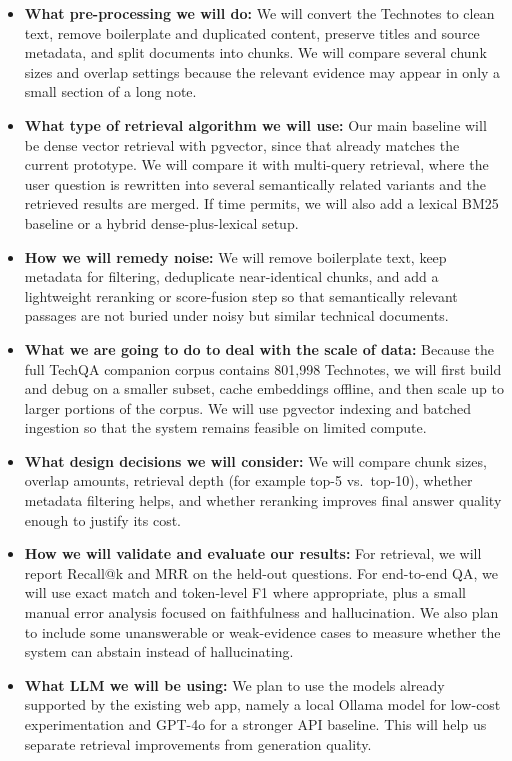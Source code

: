 \documentclass[paper=a4, fontsize=11pt]{scrartcl}
\begin{document}
\begin{itemize}
\item \textbf{What pre-processing we will do:} We will convert the Technotes to clean text, remove boilerplate and duplicated content, preserve titles and source metadata, and split documents into chunks. We will compare several chunk sizes and overlap settings because the relevant evidence may appear in only a small section of a long note.
\item \textbf{What type of retrieval algorithm we will use:} Our main baseline will be dense vector retrieval with pgvector, since that already matches the current prototype. We will compare it with multi-query retrieval, where the user question is rewritten into several semantically related variants and the retrieved results are merged. If time permits, we will also add a lexical BM25 baseline or a hybrid dense-plus-lexical setup.
\item \textbf{How we will remedy noise:} We will remove boilerplate text, keep metadata for filtering, deduplicate near-identical chunks, and add a lightweight reranking or score-fusion step so that semantically relevant passages are not buried under noisy but similar technical documents.
\item \textbf{What we are going to do to deal with the scale of data:} Because the full TechQA companion corpus contains 801,998 Technotes, we will first build and debug on a smaller subset, cache embeddings offline, and then scale up to larger portions of the corpus. We will use pgvector indexing and batched ingestion so that the system remains feasible on limited compute.
\item \textbf{What design decisions we will consider:} We will compare chunk sizes, overlap amounts, retrieval depth (for example top-5 vs.\ top-10), whether metadata filtering helps, and whether reranking improves final answer quality enough to justify its cost.
\item \textbf{How we will validate and evaluate our results:} For retrieval, we will report Recall@k and MRR on the held-out questions. For end-to-end QA, we will use exact match and token-level F1 where appropriate, plus a small manual error analysis focused on faithfulness and hallucination. We also plan to include some unanswerable or weak-evidence cases to measure whether the system can abstain instead of hallucinating.
\item \textbf{What LLM we will be using:} We plan to use the models already supported by the existing web app, namely a local Ollama model for low-cost experimentation and GPT-4o for a stronger API baseline. This will help us separate retrieval improvements from generation quality.
\end{itemize}
\end{document}
